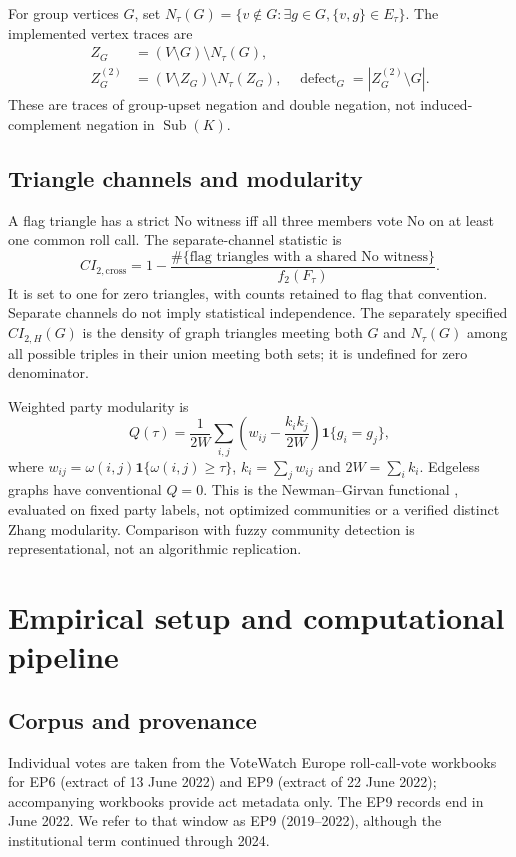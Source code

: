 \documentclass[a4paper,fleqn,oneside]{cas-sc}
\theoremstyle{definition}
\theoremstyle{plain}
\newcommand{\Sub}{\operatorname{Sub}}
\begin{document}
For group vertices $G$, set $N_\tau(G)=\{v\notin G:\exists g\in G,\{v,g\}\in E_\tau\}$. The implemented vertex traces are
\begin{align}
Z_G&=(V\setminus G)\setminus N_\tau(G),\\
Z_G^{(2)}&=(V\setminus Z_G)\setminus N_\tau(Z_G),\quad
\operatorname{defect}_G=|Z_G^{(2)}\setminus G|.
\end{align}
These are traces of group-upset negation and double negation, not induced-complement negation in $\Sub(K)$.
\subsection{Triangle channels and modularity}\label{sec:ci}\label{subsec:triangles}
A flag triangle has a strict No witness iff all three members vote No on at least one common roll call. The separate-channel statistic is
\begin{equation}
CI_{2,\mathrm{cross}}=1-\frac{\#\{\text{flag triangles with a shared No witness}\}}{f_2(F_\tau)}.
\end{equation}
It is set to one for zero triangles, with counts retained to flag that convention. Separate channels do not imply statistical independence. The separately specified $CI_{2,H}(G)$ is the density of graph triangles meeting both $G$ and $N_\tau(G)$ among all possible triples in their union meeting both sets; it is undefined for zero denominator.

Weighted party modularity is
\begin{equation}
Q(\tau)=\frac1{2W}\sum_{i,j}\left(w_{ij}-\frac{k_i k_j}{2W}\right)\mathbf1\{g_i=g_j\},
\end{equation}
where $w_{ij}=\omega(i,j)\mathbf1\{\omega(i,j)\geq\tau\}$, $k_i=\sum_jw_{ij}$ and $2W=\sum_i k_i$. Edgeless graphs have conventional $Q=0$. This is the Newman--Girvan functional \citep{NewmanGirvan2004}, evaluated on fixed party labels, not optimized communities or a verified distinct Zhang modularity. Comparison with fuzzy community detection \citep{ZhangWangZhang2007} is representational, not an algorithmic replication.
\section{Empirical setup and computational pipeline}\label{sec:empirical_setup}\label{sec:setup}
\subsection{Corpus and provenance}
Individual votes are taken from the VoteWatch Europe roll-call-vote workbooks for EP6 (extract of 13 June 2022) and EP9 (extract of 22 June 2022); accompanying workbooks provide act metadata only. The EP9 records end in June 2022. We refer to that window as EP9 (2019--2022), although the institutional term continued through 2024.
\end{document}
